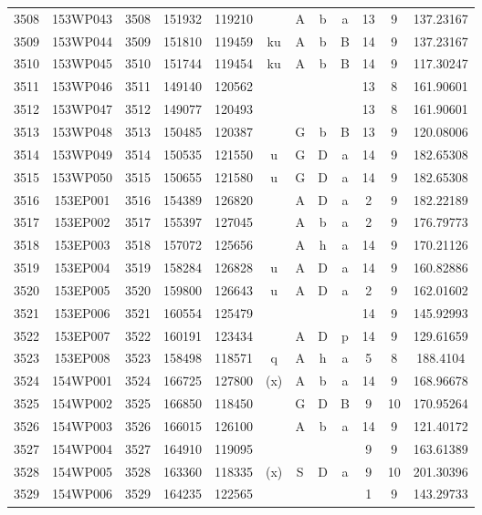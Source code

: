 \begin{tabular}{|*{12}{c|}}
3508 & 153WP043 & 3508 & 151932 & 119210 &  & A & b & a & 13 & 9 & 137.23167 \\ 
3509 & 153WP044 & 3509 & 151810 & 119459 & ku & A & b & B & 14 & 9 & 137.23167 \\ 
3510 & 153WP045 & 3510 & 151744 & 119454 & ku & A & b & B & 14 & 9 & 117.30247 \\ 
3511 & 153WP046 & 3511 & 149140 & 120562 &  &  &  &  & 13 & 8 & 161.90601 \\ 
3512 & 153WP047 & 3512 & 149077 & 120493 &  &  &  &  & 13 & 8 & 161.90601 \\ 
3513 & 153WP048 & 3513 & 150485 & 120387 &  & G & b & B & 13 & 9 & 120.08006 \\ 
3514 & 153WP049 & 3514 & 150535 & 121550 & u & G & D & a & 14 & 9 & 182.65308 \\ 
3515 & 153WP050 & 3515 & 150655 & 121580 & u & G & D & a & 14 & 9 & 182.65308 \\ 
3516 & 153EP001 & 3516 & 154389 & 126820 &  & A & D & a & 2 & 9 & 182.22189 \\ 
3517 & 153EP002 & 3517 & 155397 & 127045 &  & A & b & a & 2 & 9 & 176.79773 \\ 
3518 & 153EP003 & 3518 & 157072 & 125656 &  & A & h & a & 14 & 9 & 170.21126 \\ 
3519 & 153EP004 & 3519 & 158284 & 126828 & u & A & D & a & 14 & 9 & 160.82886 \\ 
3520 & 153EP005 & 3520 & 159800 & 126643 & u & A & D & a & 2 & 9 & 162.01602 \\ 
3521 & 153EP006 & 3521 & 160554 & 125479 &  &  &  &  & 14 & 9 & 145.92993 \\ 
3522 & 153EP007 & 3522 & 160191 & 123434 &  & A & D & p & 14 & 9 & 129.61659 \\ 
3523 & 153EP008 & 3523 & 158498 & 118571 & q & A & h & a & 5 & 8 & 188.4104 \\ 
3524 & 154WP001 & 3524 & 166725 & 127800 & (x) & A & b & a & 14 & 9 & 168.96678 \\ 
3525 & 154WP002 & 3525 & 166850 & 118450 &  & G & D & B & 9 & 10 & 170.95264 \\ 
3526 & 154WP003 & 3526 & 166015 & 126100 &  & A & b & a & 14 & 9 & 121.40172 \\ 
3527 & 154WP004 & 3527 & 164910 & 119095 &  &  &  &  & 9 & 9 & 163.61389 \\ 
3528 & 154WP005 & 3528 & 163360 & 118335 & (x) & S & D & a & 9 & 10 & 201.30396 \\ 
3529 & 154WP006 & 3529 & 164235 & 122565 &  &  &  &  & 1 & 9 & 143.29733 \\ 

\end{tabular}
